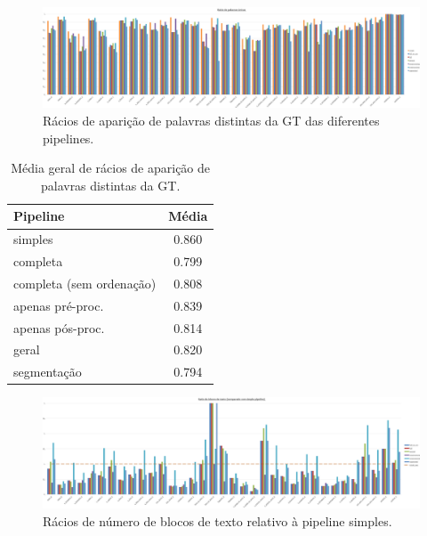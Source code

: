 \begin{figure}[H]
	\centering
	\hspace*{-2cm}
	\includegraphics[width=1.25\textwidth]{images/resultados/graph_gt_unique_word_hit_ratio.png}
	\caption{Rácios de aparição de palavras distintas da GT das diferentes pipelines.}
	\label{fig:graph_gt_unique_word_hit_ratio}
\end{figure}


\begin{table}[H]
	\centering
	\small
	\begin{tabular}{|l|c|}
		\hline
		\textbf{Pipeline} & \textbf{Média} \\ \hline
		simples & 0.860 				   \\ \hline
		completa & 0.799 				   \\ \hline
		completa (sem ordenação) & 0.808   \\ \hline
		apenas pré-proc. & 0.839 		   \\ \hline
		apenas pós-proc. & 0.814 		   \\ \hline
		geral & 0.820 					   \\ \hline
		segmentação & 0.794 			   \\ \hline
	\end{tabular}
	\caption{Média geral de rácios de aparição de palavras distintas da GT.}
\end{table}


\begin{figure}[H]
	\centering
	\hspace*{-2cm}
	\includegraphics[width=1.25\textwidth]{images/resultados/graph_text_block_ratio.png}
	\caption{Rácios de número de blocos de texto relativo à pipeline simples.}
	\label{fig:graph_text_block_ratio}
\end{figure}


